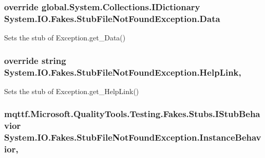 \hypertarget{class_system_1_1_i_o_1_1_fakes_1_1_stub_file_not_found_exception_a5099101c3e0410c650ef8952a3a4c8be}{
\subsubsection[{Data}]{\setlength{\rightskip}{0pt plus 5cm}override global.\-System.\-Collections.\-I\-Dictionary System.\-I\-O.\-Fakes.\-Stub\-File\-Not\-Found\-Exception.\-Data\hspace{0.3cm}{\ttfamily [get]}}}\label{class_system_1_1_i_o_1_1_fakes_1_1_stub_file_not_found_exception_a5099101c3e0410c650ef8952a3a4c8be}


Sets the stub of Exception.\-get\-\_\-\-Data()

\hypertarget{class_system_1_1_i_o_1_1_fakes_1_1_stub_file_not_found_exception_a55e17dd8ff871a028da73ac32da0a646}{
\subsubsection[{Help\-Link}]{\setlength{\rightskip}{0pt plus 5cm}override string System.\-I\-O.\-Fakes.\-Stub\-File\-Not\-Found\-Exception.\-Help\-Link\hspace{0.3cm}{\ttfamily [get]}, {\ttfamily [set]}}}\label{class_system_1_1_i_o_1_1_fakes_1_1_stub_file_not_found_exception_a55e17dd8ff871a028da73ac32da0a646}


Sets the stub of Exception.\-get\-\_\-\-Help\-Link()

\hypertarget{class_system_1_1_i_o_1_1_fakes_1_1_stub_file_not_found_exception_a094d283e411542f135d50515c17cdf67}{
\subsubsection[{Instance\-Behavior}]{\setlength{\rightskip}{0pt plus 5cm}mqttf.\-Microsoft.\-Quality\-Tools.\-Testing.\-Fakes.\-Stubs.\-I\-Stub\-Behavior System.\-I\-O.\-Fakes.\-Stub\-File\-Not\-Found\-Exception.\-Instance\-Behavior\hspace{0.3cm}{\ttfamily [get]}, {\ttfamily [set]}}}\label{class_system_1_1_i_o_1_1_fakes_1_1_stub_file_not_found_exception_a094d283e411542f135d50515c17cdf67}


